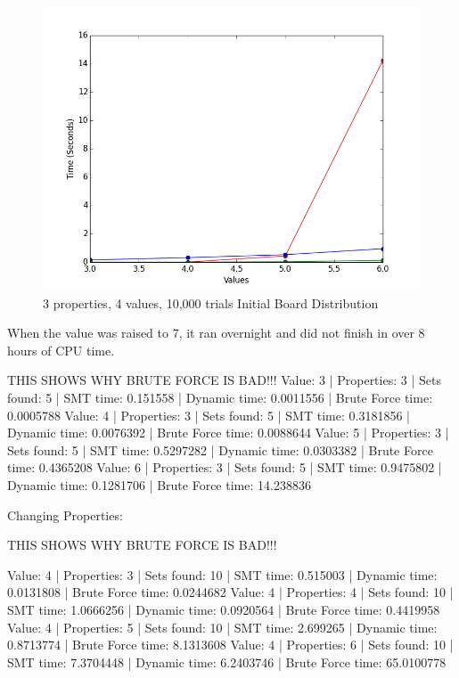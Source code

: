\documentclass[pageno]{jpaper}
\begin{document}
\begin{figure}[htbb]
\begin{minipage}[b]{0.5\linewidth}
\centering
\includegraphics[width=.75\linewidth]{BADBRUTEVAL-v3456p3n5.png}
\caption{3 properties, 4 values, 10,000 trials Initial Board Distribution}
\label{fig:bruteVal}
\end{minipage}
\end{figure}



When the value was raised to 7, it ran overnight and did not finish in over 8 hours of CPU time. 

THIS SHOWS WHY BRUTE FORCE IS BAD!!!
Value: 3 | Properties: 3 | Sets found: 5 | SMT time: 0.151558 | Dynamic time: 0.0011556 | Brute Force time: 0.0005788
Value: 4 | Properties: 3 | Sets found: 5 | SMT time: 0.3181856 | Dynamic time: 0.0076392 | Brute Force time: 0.0088644
Value: 5 | Properties: 3 | Sets found: 5 | SMT time: 0.5297282 | Dynamic time: 0.0303382 | Brute Force time: 0.4365208
Value: 6 | Properties: 3 | Sets found: 5 | SMT time: 0.9475802 | Dynamic time: 0.1281706 | Brute Force time: 14.238836



Changing Properties:


THIS SHOWS WHY BRUTE FORCE IS BAD!!!

Value: 4 | Properties: 3 | Sets found: 10 | SMT time: 0.515003 | Dynamic time: 0.0131808 | Brute Force time: 0.0244682
Value: 4 | Properties: 4 | Sets found: 10 | SMT time: 1.0666256 | Dynamic time: 0.0920564 | Brute Force time: 0.4419958
Value: 4 | Properties: 5 | Sets found: 10 | SMT time: 2.699265 | Dynamic time: 0.8713774 | Brute Force time: 8.1313608
Value: 4 | Properties: 6 | Sets found: 10 | SMT time: 7.3704448 | Dynamic time: 6.2403746 | Brute Force time: 65.0100778
\end{document}
